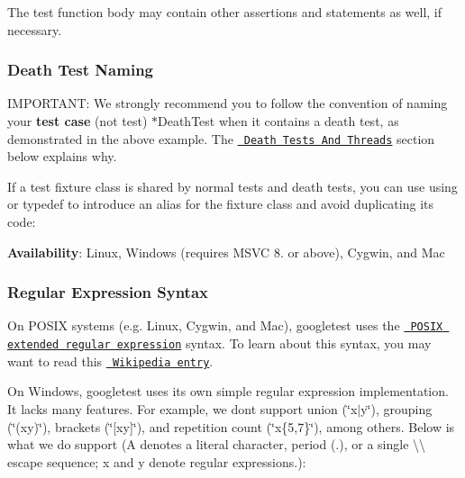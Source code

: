 The test function body may contain other assertions and statements as well, if necessary.

\subsubsection*{Death Test Naming}

I\+M\+P\+O\+R\+T\+A\+NT\+: We strongly recommend you to follow the convention of naming your {\bfseries{test case}} (not test) {\ttfamily $\ast$\+Death\+Test} when it contains a death test, as demonstrated in the above example. The \href{\#death-tests-and-threads}{\texttt{ Death Tests And Threads}} section below explains why.

If a test fixture class is shared by normal tests and death tests, you can use {\ttfamily using} or {\ttfamily typedef} to introduce an alias for the fixture class and avoid duplicating its code\+:


\begin{DoxyCode}{0}
\DoxyCodeLine{}
\DoxyCodeLine{}
\DoxyCodeLine{\}}
\DoxyCodeLine{}
\DoxyCodeLine{\}}
\end{DoxyCode}


{\bfseries{Availability}}\+: Linux, Windows (requires M\+S\+VC 8. or above), Cygwin, and Mac

\subsubsection*{Regular Expression Syntax}

On P\+O\+S\+IX systems (e.\+g. Linux, Cygwin, and Mac), googletest uses the \href{http://www.opengroup.org/onlinepubs/009695399/basedefs/xbd_chap09.html\#tag_09_04}{\texttt{ P\+O\+S\+IX extended regular expression}} syntax. To learn about this syntax, you may want to read this \href{http://en.wikipedia.org/wiki/Regular_expression\#POSIX_Extended_Regular_Expressions}{\texttt{ Wikipedia entry}}.

On Windows, googletest uses its own simple regular expression implementation. It lacks many features. For example, we don\textquotesingle{}t support union ({\ttfamily \char`\"{}x$\vert$y\char`\"{}}), grouping ({\ttfamily \char`\"{}(xy)\char`\"{}}), brackets ({\ttfamily \char`\"{}\mbox{[}xy\mbox{]}\char`\"{}}), and repetition count ({\ttfamily \char`\"{}x\{5,7\}\char`\"{}}), among others. Below is what we do support ({\ttfamily A} denotes a literal character, period ({\ttfamily .}), or a single {\ttfamily \textbackslash{}\textbackslash{}} escape sequence; {\ttfamily x} and {\ttfamily y} denote regular expressions.)\+:

